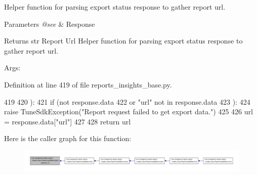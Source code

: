 Helper function for parsing export status response to gather report url. 


\begin{DoxyParams}{Parameters}
{\em @see} & Response \\
\hline
\end{DoxyParams}
\begin{DoxyReturn}{Returns}
str Report Url Helper function for parsing export status response to gather report url. \begin{DoxyVerb}        Args:\end{DoxyVerb}
 
\end{DoxyReturn}


Definition at line 419 of file reports\-\_\-insights\-\_\-base.\-py.


\begin{DoxyCode}
419 
420     ):
421         \textcolor{keywordflow}{if} (\textcolor{keywordflow}{not} response.data
422             \textcolor{keywordflow}{or} \textcolor{stringliteral}{"url"} \textcolor{keywordflow}{not} \textcolor{keywordflow}{in} response.data
423         ):
424             \textcolor{keywordflow}{raise} TuneSdkException(\textcolor{stringliteral}{"Report request failed to get export data."})
425 
426         url = response.data[\textcolor{stringliteral}{"url"}]
427 
428         \textcolor{keywordflow}{return} url
\end{DoxyCode}


Here is the caller graph for this function\-:
\nopagebreak
\begin{figure}[H]
\begin{center}
\leavevmode
\includegraphics[width=350pt]{classtune_1_1management_1_1reports_1_1reports__insights__base_1_1ReportsInsightBase_ac71e815c7e9b4f3183b81d221589cbfb_icgraph}
\end{center}
\end{figure}


